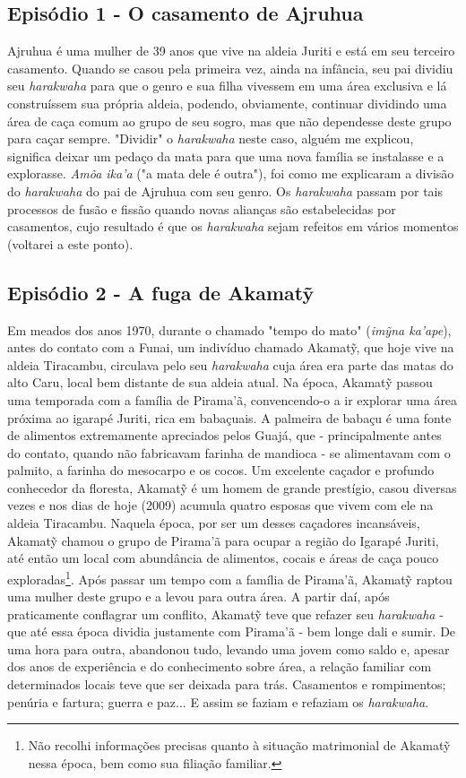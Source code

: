 \subsection{Episódio 1 - O casamento de Ajruhua}

Ajruhua é uma mulher de 39 anos que vive na aldeia Juriti e está em seu
terceiro casamento. Quando se casou pela primeira vez, ainda na
infância, seu pai dividiu seu \emph{harakwaha} para que o genro e sua
filha vivessem em uma área exclusiva e lá construíssem sua própria
aldeia, podendo, obviamente, continuar dividindo uma área de caça comum
ao grupo de seu sogro, mas que não dependesse deste grupo para caçar
sempre. "Dividir" o \emph{harakwaha} neste caso, alguém me explicou,
significa deixar um pedaço da mata para que uma nova família se
instalasse e a explorasse. \emph{Amõa ika'a} ("a mata dele é outra"),
foi como me explicaram a divisão do \emph{harakwaha} do pai de Ajruhua
com seu genro. Os \emph{harakwaha} passam por tais processos de fusão e
fissão quando novas alianças são estabelecidas por casamentos, cujo
resultado é que os \emph{harakwaha} sejam refeitos em vários momentos
(voltarei a este ponto).

\subsection{Episódio 2 - A fuga de Akamatỹ}

Em meados dos anos 1970, durante o chamado "tempo do mato" (\emph{imỹna
ka'ape}), antes do contato com a Funai, um indivíduo chamado Akamatỹ,
que hoje vive na aldeia Tiracambu, circulava pelo seu \emph{harakwaha}
cuja área era parte das matas do alto Caru, local bem distante de sua
aldeia atual. Na época, Akamatỹ passou uma temporada com a família de
Pirama'ã, convencendo-o a ir explorar uma área próxima ao igarapé
Juriti, rica em babaçuais. A palmeira de babaçu é uma fonte de alimentos
extremamente apreciados pelos Guajá, que - principalmente antes do
contato, quando não fabricavam farinha de mandioca - se alimentavam com
o palmito, a farinha do mesocarpo e os cocos. Um excelente caçador e
profundo conhecedor da floresta, Akamatỹ é um homem de grande prestígio,
casou diversas vezes e nos dias de hoje (2009) acumula quatro esposas
que vivem com ele na aldeia Tiracambu. Naquela época, por ser um desses
caçadores incansáveis, Akamatỹ chamou o grupo de Pirama'ã para ocupar a
região do Igarapé Juriti, até então um local com abundância de
alimentos, cocais e áreas de caça pouco exploradas\footnote{Não recolhi
  informações precisas quanto à situação matrimonial de Akamatỹ nessa
  época, bem como sua filiação familiar.}. Após passar um tempo com a
família de Pirama'ã, Akamatỹ raptou uma mulher deste grupo e a levou
para outra área. A partir daí, após praticamente conflagrar um conflito,
Akamatỹ teve que refazer seu \emph{harakwaha} - que até essa época
dividia justamente com Pirama'ã - bem longe dali e sumir. De uma hora
para outra, abandonou tudo, levando uma jovem como saldo e, apesar dos
anos de experiência e do conhecimento sobre área, a relação familiar com
determinados locais teve que ser deixada para trás. Casamentos e
rompimentos; penúria e fartura; guerra e paz... E assim se faziam e
refaziam os \emph{harakwaha}.


